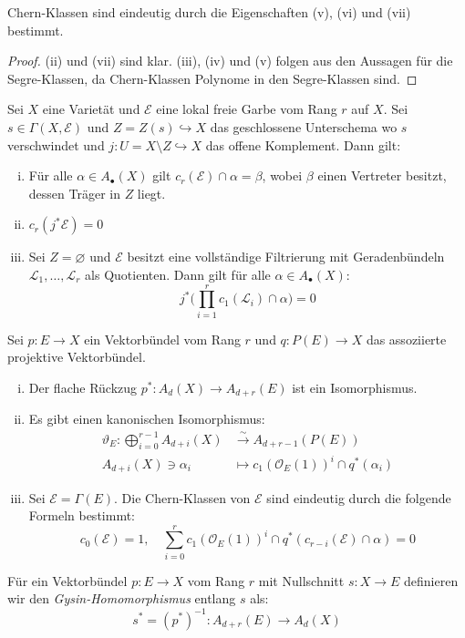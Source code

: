 \documentclass[10pt,a4paper]{article}
\begin{document}
\begin{remark}
Chern-Klassen sind eindeutig durch die Eigenschaften (v), (vi) und (vii) bestimmt.
\end{remark}

\begin{proof}
(ii) und (vii) sind klar. (iii), (iv) und (v) folgen aus den Aussagen für die Segre-Klassen, da Chern-Klassen Polynome in den Segre-Klassen sind.
\end{proof}

\begin{proposition}
Sei $X$ eine Varietät und $\mathcal{E}$ eine lokal freie Garbe vom Rang $r$ auf $X$. Sei $s\in\Gamma(X,\mathcal{E})$ und $Z=Z(s)\hookrightarrow X$ das geschlossene Unterschema wo $s$ verschwindet und $j:U=X\setminus Z\hookrightarrow X$ das offene Komplement. Dann gilt:
\begin{enumerate}[(i)]
\item Für alle $\alpha\in A_\bullet(X)$ gilt $c_r(\mathcal{E})\cap\alpha = \beta$, wobei $\beta$ einen Vertreter besitzt, dessen Träger in $Z$ liegt.
\item $c_r(j^\ast\mathcal{E}) = 0$
\item Sei $Z=\varnothing$ und $\mathcal{E}$ besitzt eine vollständige Filtrierung mit Geradenbündeln $\mathcal{L}_1,\ldots,\mathcal{L}_r$ als Quotienten. Dann gilt für alle $\alpha\in A_\bullet(X)$:
\[ j^\ast\Big(\prod_{i=1}^r c_1(\mathcal{L}_i)\cap\alpha \Big) = 0 \]
\end{enumerate}
\end{proposition}

\begin{theorem}
Sei $p:E\to X$ ein Vektorbündel vom Rang $r$ und $q:P(E)\to X$ das assoziierte projektive Vektorbündel.
\begin{enumerate}[(i)]
\item Der flache Rückzug $p^\ast: A_d(X)\to A_{d+r}(E)$ ist ein Isomorphismus.
\item Es gibt einen kanonischen Isomorphismus:
\begin{align*}
\vartheta_E: \bigoplus_{i=0}^{r-1}A_{d+i}(X) &\stackrel{\sim}{\longrightarrow} A_{d+r-1}(P(E))\\
A_{d+i}(X)\ni \alpha_i &\longmapsto c_1(\mathcal{O}_E(1))^i\cap q^\ast(\alpha_i)
\end{align*}
\item Sei $\mathcal{E} = \Gamma(E)$. Die Chern-Klassen von $\mathcal{E}$ sind eindeutig durch die folgende Formeln bestimmt:
\[ c_0(\mathcal{E}) = 1,\quad \sum_{i=0}^r c_1(\mathcal{O}_E(1))^i\cap q^\ast(c_{r-i}(\mathcal{E})\cap\alpha) = 0 \]
\end{enumerate}
\end{theorem}

\begin{definition}
Für ein Vektorbündel $p:E\to X$ vom Rang $r$ mit Nullschnitt $s:X\to E$ definieren wir den \textit{Gysin-Homomorphismus} entlang $s$ als:
\[ s^\ast = (p^\ast)^{-1}: A_{d+r}(E)\to A_d(X) \]
\end{definition}
\end{document}

